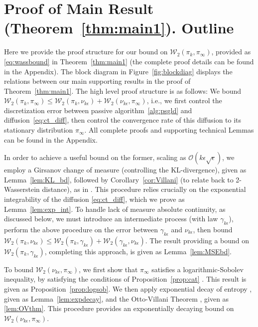 \documentclass[journal,onecolumn]{IEEEtran}
\newcommand{\step}{\epsilon}
\newcommand{\wass}{\mathcal{W}_2}
\newcommand{\gibbs}{\ids_{\infty}}
\newcommand{\dtlaw}{\ids_{k}} %
\newcommand{\ctlaw}{\nu_{k\step}}
\newcommand{\ids}{\pi}
\newcommand{\idw}{\gamma}
\newcommand{\ksp}{k,\idw}
\newcommand{\ytlaw}{\gamma_{k\step}}
\begin{document}
{\section{Proof of Main Result (Theorem~\ref{thm:main1}). Outline}
\label{sec:resultspf}
Here we provide the proof structure for our bound on $\wass(\dtlaw,\gibbs)$, provided as \eqref{eq:wassbound} in Theorem~\ref{thm:main1} (the complete proof details can be found in the Appendix). The block diagram in Figure~\ref{fig:blockdiag} displays the relations between our main supporting results in the proof of Theorem~\ref{thm:main1}. The high level proof structure is as follows: We bound $\wass(\dtlaw,\gibbs) \leq \wass(\dtlaw,\ctlaw) + \wass(\ctlaw,\gibbs)$, i.e., we first control the discretization error between passive algorithm~\ref{alg:psgld} and diffusion~\ref{eq:ct_diff}, then control the convergence rate of this diffusion to its stationary distribution $\gibbs$. All complete proofs and supporting technical Lemmas can be found in the Appendix.

In order to achieve a useful bound on the former, scaling as $\mathcal{O}(k\step\sqrt{\step})$, we employ a Girsanov change of measure (controlling the KL-divergence), given as Lemma~\ref{lem:KL_bd}, followed by Corollary~\ref{cor:Villani} (to relate back to 2-Wasserstein distance), as in \cite{raginsky2017non}. This procedure relies crucially on the exponential integrability of the diffusion \eqref{eq:ct_diff}, which we prove as Lemma~\ref{lem:exp_int}. To handle lack of measure absolute continuity, as discussed below, we must introduce an intermediate process (with law $\ytlaw$), perform the above procedure on the error between $\ytlaw$ and $\ctlaw$, then bound $\wass(\dtlaw,\ctlaw) \leq \wass(\dtlaw,\ytlaw) + \wass(\ytlaw,\ctlaw)$. The result providing a bound on $\wass(\dtlaw,\ytlaw)$, completing this approach, is given as Lemma~\ref{lem:MSEbd}.

To bound $\wass(\ctlaw,\gibbs)$, we first show that $\gibbs$ satisfies a logarithmic-Sobolev inequality, by satisfying the conditions of Proposition~\ref{prop:cat} \cite{cattiaux2008note}. This result is given as Proposition~\ref{prop:logsob}. We then apply exponential decay of entropy \cite{bakry2014analysis}, given as Lemma~\ref{lem:expdecay}, and the Otto-Villani Theorem \cite{bakry2008simple}, given as \ref{lem:OVthm}. This procedure provides an exponentially decaying bound on $\wass(\ctlaw,\gibbs)$.


\begin{figure}
\centering
{\hspace*{-0.2cm}}
\end{figure}}
\end{document}
